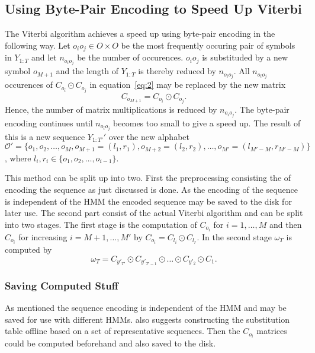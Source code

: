 \subsection{Using Byte-Pair Encoding to Speed Up Viterbi}
\label{sec:using-byte-pair}

The Viterbi algorithm achieves a speed up using byte-pair encoding in the
following way. Let $o_i o_j \in O \times O$ be the most frequently occuring
pair of symbols in $Y_{1:T}$ and let $n_{o_i o_j}$ be the number of
occurences. $o_i o_j$ is substituded by a new symbol $o_{M + 1}$ and the length
of $Y_{1:T}$ is thereby reduced by $n_{o_i o_j}$. All $n_{o_i o_j}$ occurences
of $C_{o_i} \odot C_{o_j}$ in equation~\eqref{eq:2} may be replaced by the new
matrix
\begin{equation}
  C_{o_{M + 1}} = C_{o_i} \odot C_{o_j}.
\end{equation}
Hence, the number of matrix multiplications is reduced by $n_{o_i o_j}$. The
byte-pair encoding continues until $n_{o_i o_j}$ becomes too small to give a
speed up.  The result of this is a new sequence
$Y_{1:T'}'$ over the new alphabet
$\mathcal{O}' = \{o_1, o_2, \dots, o_M, o_{M + 1} = (l_1, r_1), o_{M + 2} =
(l_2, r_2), \dots, o_{M'} = (l_{M' - M}, r_{M' - M}) \}$,
where $l_i, r_i \in \{ o_1, o_2, \dots, o_{i - 1} \}$.

This method can be split up into two. First the preprocessing consisting the of
encoding the sequence as just discussed is done. As the encoding of the
sequence is independent of the HMM the encoded sequence may be saved to the
disk for later use. The second part consist of the actual Viterbi algorithm
and can be split into two stages. The first stage is the computation of
$C_{o_i}$ for $i = 1, \dots, M$ and then $C_{o_i}$ for increasing
$i = M + 1, \dots, M'$ by $C_{o_i} = C_{l_i} \odot C_{l_r}$. In the second
stage $\omega_T$ is computed by
\begin{equation}
  \label{eq:3}
  \omega_T = C_{y'_{T'}} \odot C_{y'_{T'-1}} \odot \dots \odot C_{y'_2} \odot C_1.
\end{equation}


\subsubsection{Saving Computed Stuff}
\label{sec:saving-comp-stuff}

As mentioned the sequence encoding is independent of the HMM and may be saved
for use with different HMMs. \citet{lifshits2009speeding} also suggests
constructing the substitution table offline based on a set of representative
sequences. Then the $C_{o_i}$ matrices could be computed beforehand and also
saved to the disk.


